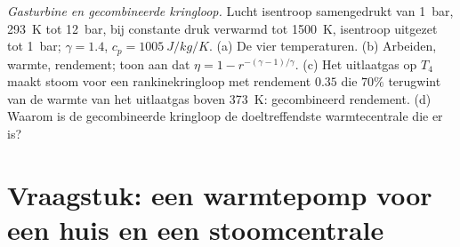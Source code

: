\begin{exercise}[$\star\star\star$]\label{exo:b2:open-systems:12}
\emph{Gasturbine en gecombineerde kringloop.} Lucht isentroop samengedrukt
van \qty{1}{bar}, \qty{293}{K} tot \qty{12}{bar}, bij constante druk verwarmd
tot \qty{1500}{K}, isentroop uitgezet tot \qty{1}{bar}; $\gamma = 1.4$,
$c_p = \qty{1005}{J/kg/K}$. (a) De vier temperaturen. (b) Arbeiden,
warmte, rendement; toon aan dat $\eta = 1 - r^{-(\gamma - 1)/\gamma}$. (c) Het
uitlaatgas op $T_4$ maakt stoom voor een rankinekringloop met rendement $0.35$
die $70\%$ terugwint van de warmte van het uitlaatgas boven \qty{373}{K}:
gecombineerd
rendement. (d) Waarom is de gecombineerde kringloop de doeltreffendste
warmte\-centrale die er is?
\end{exercise}

\section{Vraagstuk: een warmtepomp voor een huis en een stoomcentrale}

